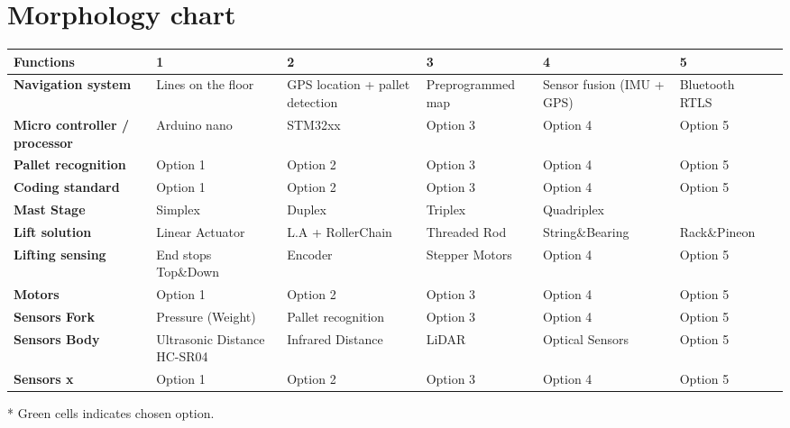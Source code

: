 \documentclass[landscape]{article}
\begin{document}
\section{Morphology chart}
\begin{table}[H]
    \begin{center}
        \begin{tabularx}{\linewidth}{L|L|L|L|L|L|L}
            \textbf{Functions} & \textbf{1} & \textbf{2}& \textbf{3} & 
            \textbf{4} & \textbf{5} \\
            \hline
            \textbf{Navigation system} & Lines on the floor & GPS location + pallet detection & Preprogrammed map  & Sensor fusion (IMU + GPS) & 
            Bluetooth RTLS \\
            \hline
            \textbf{Micro controller / processor} & Arduino nano & STM32xx & Option 3 & Option 4 & 
            Option 5 \\
            \hline
            \textbf{Pallet recognition} & Option 1 & Option 2 & Option 3 & Option 4 & 
            Option 5 \\
            \hline
            \textbf{Coding standard} & Option 1 & Option 2 & Option 3 & Option 4 & 
            Option 5 \\
            \hline
            \textbf{Mast Stage} & Simplex & Duplex & Triplex & Quadriplex & 
            \\
            \hline
            \textbf{Lift solution} & Linear Actuator & L.A + RollerChain & Threaded Rod& String\&Bearing & Rack\&Pineon \\
            \hline
            \textbf{Lifting sensing} & End stops Top\&Down & Encoder & Stepper Motors & Option 4 & 
            Option 5 \\
            \hline
            \textbf{Motors} & Option 1 & Option 2 & Option 3 & Option 4 & 
            Option 5 \\
            \hline
            \textbf{Sensors Fork} & Pressure (Weight) & Pallet recognition & Option 3 & Option 4 & 
            Option 5 \\
            \hline
            \textbf{Sensors Body} & Ultrasonic Distance HC-SR04 & Infrared Distance & LiDAR & Optical Sensors & 
            Option 5 \\
            \hline
            \textbf{Sensors x} & Option 1 & Option 2 & Option 3 & Option 4 & 
            Option 5 \\
            \hline
        \end{tabularx}
    \end{center}
\end{table}
* Green cells indicates chosen option.
\end{document}

